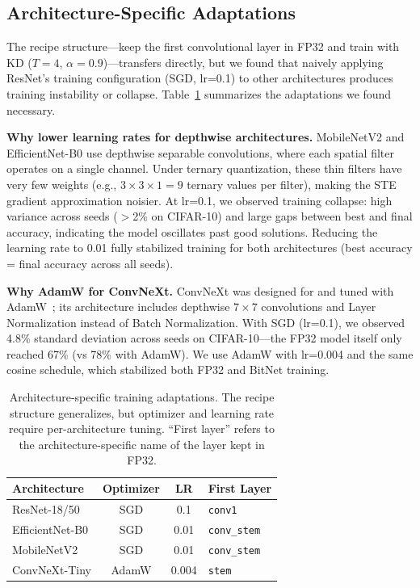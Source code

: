 \documentclass[10pt]{article}
\begin{document}
\subsection{Architecture-Specific Adaptations}

The recipe structure---keep the first convolutional layer in FP32 and train with KD ($T=4$, $\alpha=0.9$)---transfers directly, but we found that naively applying ResNet's training configuration (SGD, lr=0.1) to other architectures produces training instability or collapse. Table~\ref{tab:arch_tuning} summarizes the adaptations we found necessary.

\textbf{Why lower learning rates for depthwise architectures.} MobileNetV2 and EfficientNet-B0 use depthwise separable convolutions, where each spatial filter operates on a single channel. Under ternary quantization, these thin filters have very few weights (e.g., $3 \times 3 \times 1 = 9$ ternary values per filter), making the STE gradient approximation noisier. At lr=0.1, we observed training collapse: high variance across seeds ($>$2\% on CIFAR-10) and large gaps between best and final accuracy, indicating the model oscillates past good solutions. Reducing the learning rate to 0.01 fully stabilized training for both architectures (best accuracy = final accuracy across all seeds).

\textbf{Why AdamW for ConvNeXt.} ConvNeXt was designed for and tuned with AdamW~\cite{liu2022convnext}; its architecture includes depthwise $7 \times 7$ convolutions and Layer Normalization instead of Batch Normalization. With SGD (lr=0.1), we observed 4.8\% standard deviation across seeds on CIFAR-10---the FP32 model itself only reached 67\% (vs 78\% with AdamW). We use AdamW with lr=0.004 and the same cosine schedule, which stabilized both FP32 and BitNet training.

\begin{table}[ht]
\centering
\caption{Architecture-specific training adaptations. The recipe structure generalizes, but optimizer and learning rate require per-architecture tuning. ``First layer'' refers to the architecture-specific name of the layer kept in FP32.}
\label{tab:arch_tuning}
\begin{tabular}{lccl}
\toprule
Architecture & Optimizer & LR & First Layer \\
\midrule
ResNet-18/50 & SGD & 0.1 & \texttt{conv1} \\
EfficientNet-B0 & SGD & 0.01 & \texttt{conv\_stem} \\
MobileNetV2 & SGD & 0.01 & \texttt{conv\_stem} \\
ConvNeXt-Tiny & AdamW & 0.004 & \texttt{stem} \\
\bottomrule
\end{tabular}
\end{table}
\end{document}

